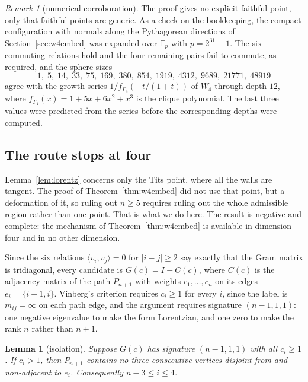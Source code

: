 \documentclass[11pt]{article}
\newtheorem{lemma}[theorem]{Lemma}
\theoremstyle{definition}
\theoremstyle{remark}
\newtheorem{remark}[theorem]{Remark}
\theoremstyle{definition}
\begin{document}
\begin{remark}[numerical corroboration]\label{rem:w4num}
The proof gives no explicit faithful point, only that faithful points are generic. As a check on
the bookkeeping, the compact configuration with normals along the Pythagorean directions of
Section~\ref{sec:w4embed} was expanded over $\mathbb{F}_p$ with $p=2^{31}-1$. The six commuting relations
hold and the four remaining pairs fail to commute, as required, and the sphere sizes
\[
  1,\;5,\;14,\;33,\;75,\;169,\;380,\;854,\;1919,\;4312,\;9689,\;21771,\;48919
\]
agree with the growth series $1/f_{\Gamma_4}(-t/(1+t))$ of $W_4$ through depth $12$, where
$f_{\Gamma_4}(x)=1+5x+6x^2+x^3$ is the clique polynomial. The last three values were predicted
from the series before the corresponding depths were computed.
\end{remark}

\subsection{The route stops at four}\label{sec:stopsatfour}

Lemma~\ref{lem:lorentz} concerns only the Tits point, where all the walls are tangent. The proof
of Theorem~\ref{thm:w4embed} did not use that point, but a deformation of it, so ruling out
$n\ge5$ requires ruling out the whole admissible region rather than one point. That is what we do
here. The result is negative and complete: the mechanism of Theorem~\ref{thm:w4embed} is available
in dimension four and in no other dimension.

Since the six relations $\langle v_i,v_j\rangle=0$ for $|i-j|\ge2$ say exactly that the Gram matrix
is tridiagonal, every candidate is $G(c)=I-C(c)$, where $C(c)$ is the adjacency matrix of the path
$P_{n+1}$ with weights $c_1,\dots,c_n$ on its edges $e_i=\{i-1,i\}$. Vinberg's criterion requires
$c_i\ge1$ for every $i$, since the label is $m_{ij}=\infty$ on each path edge, and the argument
requires signature $(n-1,1,1)$: one negative eigenvalue to make the form Lorentzian, and one zero
to make the rank $n$ rather than $n+1$.

\begin{lemma}[isolation]\label{lem:isolate}
Suppose $G(c)$ has signature $(n-1,1,1)$ with all $c_i\ge1$. If $c_i>1$, then $P_{n+1}$ contains no
three consecutive vertices disjoint from and non-adjacent to $e_i$. Consequently $n-3\le i\le4$.
\end{lemma}
\end{document}
